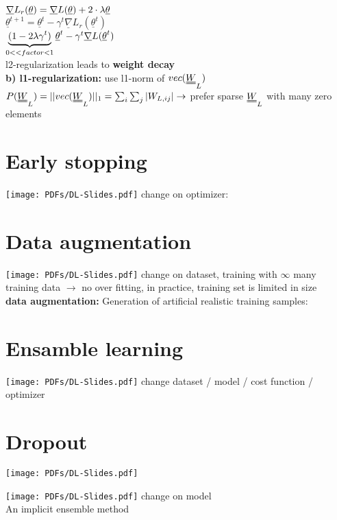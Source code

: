 $ \underline{\nabla} L_r (\underline{\theta}) = \underline{\nabla} L(\underline{\theta}) + 2 \cdot \lambda \underline{\theta} $ \\
$ \underline{\theta}^{t+1} = \underline{\theta}^t - \gamma^t \underline{\nabla } L_r (\underline{\theta}^t) $ \\
 $\underbrace{(1- 2 \lambda \gamma^t)}_{0 << factor <1}  \underline{\theta}^t - \gamma^t \underline{\nabla} L(\underline{\theta}^t) $\\
 l2-regularization leads to \textbf{weight decay } \\
\textbf{ b) l1-regularization: } use l1-norm of $ vec(\W_L) $ \\
$  P(\W_L) = || vec (\W_L) ||_1 = \sum_i \sum_j | W_{L,ij} | \\
\rightarrow  $ prefer sparse $ \W_L $ with many zero elements\\
\section{Early stopping}
\texttt{[image: PDFs/DL-Slides.pdf]}
change on optimizer:\\
\section{Data augmentation} 
\texttt{[image: PDFs/DL-Slides.pdf]}
change on dataset, training with $ \infty $ many training data $\rightarrow$ no over fitting, in practice, training set is limited in size\\
\textbf{data augmentation:} Generation of artificial realistic training samples: 
\section{Ensamble learning}
\texttt{[image: PDFs/DL-Slides.pdf]}
change dataset / model / cost function /  optimizer\\
\section{Dropout}
\texttt{[image: PDFs/DL-Slides.pdf]}

\texttt{[image: PDFs/DL-Slides.pdf]}
change on model \\
An implicit ensemble method\\
